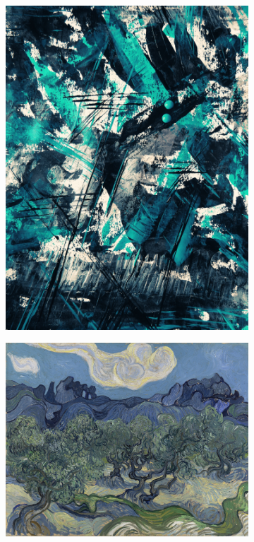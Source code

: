 \begin{figure}[H]
    \centering

    \begin{subfigure}[h]{0.32\textwidth}
        \centering
        \quad
    \end{subfigure}
    \begin{subfigure}[h]{0.32\textwidth}
        \centering
        \includegraphics[width=\textwidth]{resources/content/style/teal_and_black_abstract_painting.jpg}
    \end{subfigure}
    \begin{subfigure}[h]{0.32\textwidth}
        \centering
        \includegraphics[width=\textwidth]{resources/content/style/the_olive_trees.jpg}

\end{subfigure}
\end{figure}
